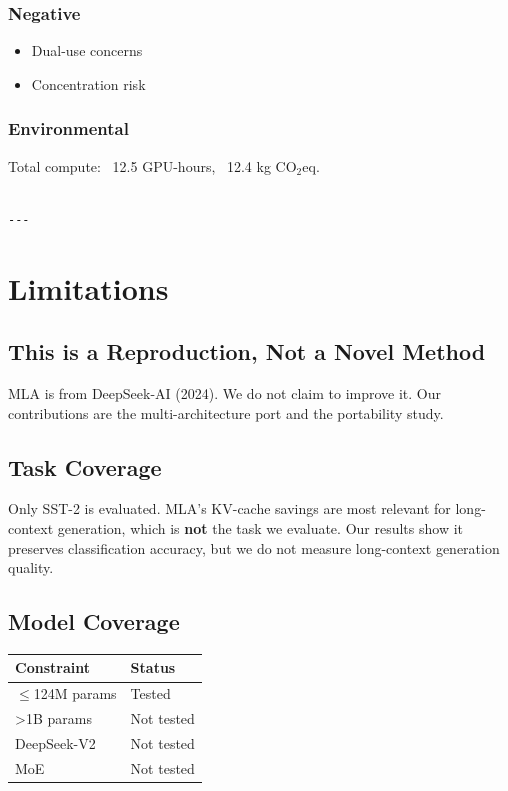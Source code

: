 \subsubsection{Negative}
\begin{itemize}
\item Dual-use concerns
\item Concentration risk

\end{itemize}
\subsubsection{Environmental}
Total compute: ~12.5 GPU-hours, ~12.4 kg CO$_2$eq.
\begin{lstlisting}

---
\end{lstlisting}


\section{Limitations}

\subsection{This is a Reproduction, Not a Novel Method}

MLA is from DeepSeek-AI (2024). We do not claim to improve it. Our 
contributions are the multi-architecture port and the portability study.

\subsection{Task Coverage}

Only SST-2 is evaluated. MLA's KV-cache savings are most relevant for 
long-context generation, which is \textbf{not} the task we evaluate. Our results 
show it preserves classification accuracy, but we do not measure 
long-context generation quality.

\subsection{Model Coverage}

\begin{table}[H]
\centering
\small
\begin{tabular}{ll}
\toprule
\textbf{Constraint} & \textbf{Status} \\
\midrule
$\le$124M params & Tested \\
>1B params & Not tested \\
DeepSeek-V2 & Not tested \\
MoE & Not tested \\
\bottomrule
\end{tabular}
\end{table}


